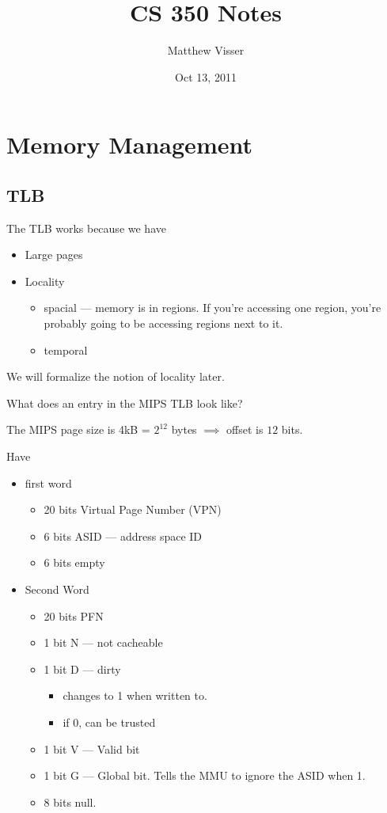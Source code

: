 \documentclass[12pt]{article}
\begin{document}
\title{CS 350 Notes}
\author{Matthew Visser}
\date{Oct 13, 2011}
\maketitle

\section{Memory Management}
\subsection{TLB}

The TLB works because we have
\begin{itemize}
	\item Large pages
	\item Locality
		\begin{itemize}
			\item spacial --- memory is in regions. If you're accessing one
				region, you're probably going to be accessing regions next to
				it.
			\item temporal
		\end{itemize}
\end{itemize}

We will formalize the notion of locality later.

What does an entry in the MIPS TLB look like?

The MIPS page size is 4kB = $2^{12}$ bytes $\implies$ offset is $12$ bits.

Have 
\begin{itemize}
	\item first word
		\begin{itemize}
			\item 20 bits Virtual Page Number (VPN)
			\item 6 bits ASID --- address space ID
			\item 6 bits empty
		\end{itemize}
	\item Second Word
		\begin{itemize}
			\item 20 bits PFN
			\item 1 bit N --- not cacheable
			\item 1 bit D --- dirty
				\begin{itemize}
					\item changes to 1 when written to.
					\item if 0, can be trusted
				\end{itemize}
			\item 1 bit V --- Valid bit
			\item 1 bit G --- Global bit. Tells the MMU to ignore the ASID when
				1.
			\item 8 bits null.
		\end{itemize}
\end{itemize}
\end{document}
